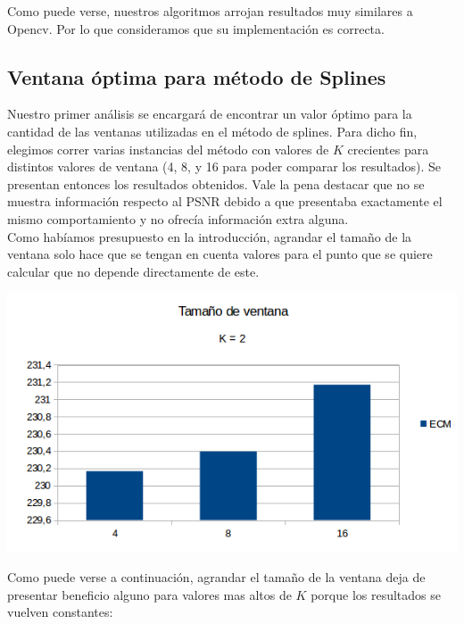Como puede verse, nuestros algoritmos arrojan resultados muy similares a Opencv. Por lo que consideramos que su implementación es correcta.

\subsection{Ventana óptima para método de Splines}
Nuestro primer análisis se encargará de encontrar un valor óptimo para la cantidad de las ventanas utilizadas en el método de splines.
Para dicho fin, elegimos correr varias instancias del método con valores de $K$ crecientes para distintos valores de ventana (4, 8, y 16 para poder comparar los resultados). Se presentan entonces los resultados obtenidos. Vale la pena destacar que no se muestra información respecto al PSNR debido a que presentaba exactamente el mismo comportamiento y no ofrecía información extra alguna.
\\
Como habíamos presupuesto en la introducción, agrandar el tamaño de la ventana solo hace que se tengan en cuenta valores para el punto que se quiere calcular que no depende directamente de este. 

\begin{center}
\includegraphics[scale=0.50]{imagenes/VK2.png}
\end{center}

Como puede verse a continuación, agrandar el tamaño de la ventana deja de presentar beneficio alguno para valores mas altos de $K$ porque los resultados se vuelven constantes:

